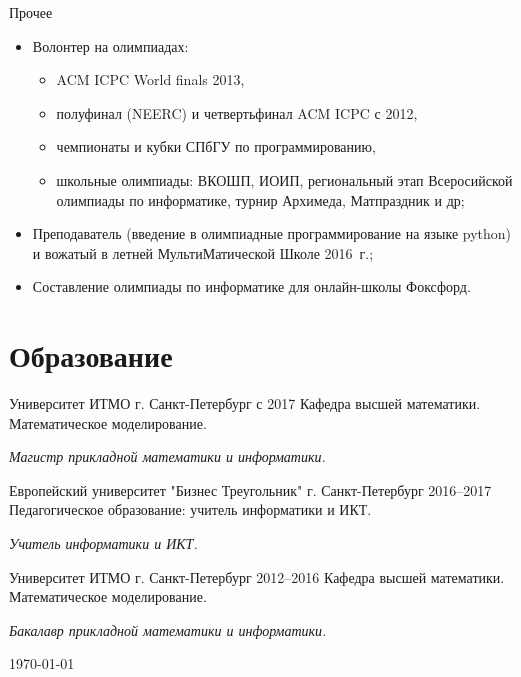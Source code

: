 \documentclass{cv}
\begin{document}
\begin{cvblock}{Прочее}
  \begin{itemize}
      \item Волонтер на олимпиадах: \begin{itemize}
          \item ACM ICPC World finals 2013, 
          \item полуфинал (NEERC) и четвертьфинал ACM ICPC с 2012,
          \item чемпионаты и кубки СПбГУ по программированию,
          \item школьные олимпиады: ВКОШП, ИОИП, региональный этап Всеросийской
                олимпиады по информатике, турнир Архимеда, Матпраздник и др;
      \end{itemize}
      \item Преподаватель (введение в олимпиадные программирование на языке
            python) и вожатый в летней МультиМатической Школе 2016~г.;
      \item Составление олимпиады по информатике для онлайн-школы Фоксфорд.
  \end{itemize}
\end{cvblock}


\section{Образование}

\begin{cvblock}{%
  \blocktitle
    {Университет ИТМО}
    {г. Санкт-Петербург}
    {}
    {с 2017}}
  Кафедра высшей математики. Математическое моделирование.
  \vspace{1em}

  \textit{Магистр прикладной математики и информатики.}
\end{cvblock}

\begin{cvblock}{%
  \blocktitle
    {Европейский университет "Бизнес Треугольник"}
    {г. Санкт-Петербург}
    {}
    {2016--2017}}
  Педагогическое образование: учитель информатики и ИКТ.
  \vspace{1em}

  \textit{Учитель информатики и ИКТ.}
\end{cvblock}

\begin{cvblock}{%
  \blocktitle
    {Университет ИТМО}
    {г. Санкт-Петербург}
    {}
    {2012--2016}}
  Кафедра высшей математики. Математическое моделирование.
  \vspace{1em}

  \textit{Бакалавр прикладной математики и информатики.}
\end{cvblock}


\vfill
\begin{center}
  \monthyear\today
\end{center}
\end{document}
